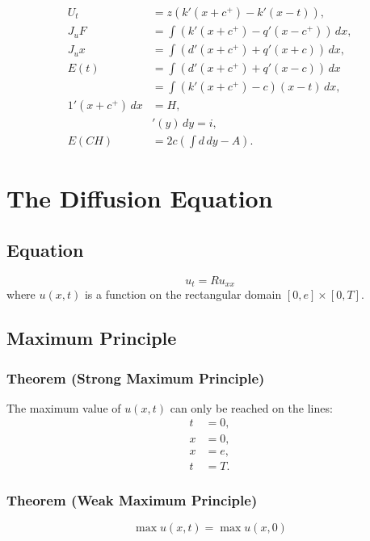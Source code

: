 \documentclass[11pt]{article}
\begin{document}
\begin{align}
    U_t &= z(k'(x + c^+) - k'(x - t)), \\
    J_u F &= \int (k'(x + c^+) - q'(x - c^+)) \, dx, \\
    J_u x &= \int (d'(x + c^+) + q'(x + c)) \, dx, \\
    E(t) &= \int (d'(x + c^+) + q'(x - c)) \, dx \\
    &= \int (k'(x + c^+) - c) (x - t) \, dx, \\
    1'(x + c^+) \, dx &= H, \\
    &'(y) \, dy = i, \\
    E(CH) &= 2c \left( \int d \, dy - A \right).
\end{align}



\clearpage

\section*{The Diffusion Equation}

\subsection*{Equation}
\begin{equation}
    u_t = R u_{xx}
\end{equation}
where \( u(x, t) \) is a function on the rectangular domain \([0, e] \times [0, T]\).

\subsection*{Maximum Principle}

\subsubsection*{Theorem (Strong Maximum Principle)}
The maximum value of \( u(x, t) \) can only be reached on the lines:
\begin{align*}
    t &= 0, \\
    x &= 0, \\
    x &= e, \\
    t &= T.
\end{align*}

\subsubsection*{Theorem (Weak Maximum Principle)}
\begin{equation}
    \max u(x, t) = \max u(x, 0)
\end{equation}
\end{document}
